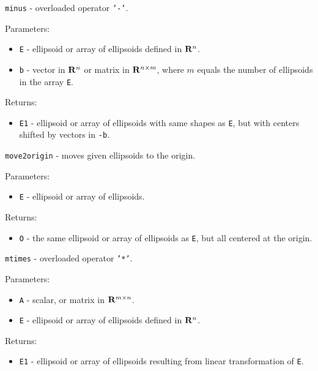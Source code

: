 \documentclass{report}
\begin{document}


\newpage

{\Large {\tt minus}} - overloaded operator {\tt '-'}.

Parameters:
\begin{itemize}
\item {\tt E} - ellipsoid or array of ellipsoids defined in ${\bf R}^n$.
\item {\tt b} - vector in ${\bf R}^n$ or matrix in ${\bf R}^{n\times m}$,
where $m$ equals the number of ellipsoids in the array {\tt E}.
\end{itemize}

Returns:
\begin{itemize}
\item {\tt E1} - ellipsoid or array of ellipsoids with same shapes as {\tt E},
but with centers shifted by vectors in {\tt -b}.
\end{itemize}



\newpage

{\Large {\tt move2origin}} - moves given ellipsoids to the origin.

Parameters:
\begin{itemize}
\item {\tt E} - ellipsoid or array of ellipsoids.
\end{itemize}

Returns:
\begin{itemize}
\item {\tt O} - the same ellipsoid or array of ellipsoids as {\tt E},
but all centered at the origin.
\end{itemize}



\newpage

{\Large {\tt mtimes}} - overloaded operator {\tt '*'}.

Parameters:
\begin{itemize}
\item {\tt A} - scalar, or matrix in ${\bf R}^{m\times n}$.
\item {\tt E} - ellipsoid or array of ellipsoids defined in ${\bf R}^n$.
\end{itemize}

Returns:
\begin{itemize}
\item {\tt E1} - ellipsoid or array of ellipsoids resulting from linear
transformation of {\tt E}.
\end{itemize}
\end{document}
